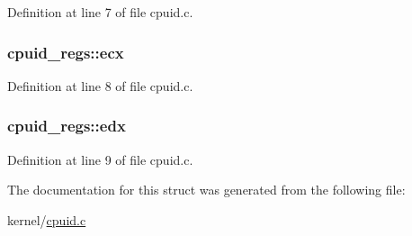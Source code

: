 \-Definition at line 7 of file cpuid.\-c.

\hypertarget{structcpuid__regs_a61c345a6aec2b65698243b63bb284ec3}{
\subsubsection[{ecx}]{ {\bf cpuid\-\_\-regs\-::ecx}}}\label{structcpuid__regs_a61c345a6aec2b65698243b63bb284ec3}


\-Definition at line 8 of file cpuid.\-c.

\hypertarget{structcpuid__regs_af071577d6f7f2ceb97e0f39d155cfaad}{
\subsubsection[{edx}]{ {\bf cpuid\-\_\-regs\-::edx}}}\label{structcpuid__regs_af071577d6f7f2ceb97e0f39d155cfaad}


\-Definition at line 9 of file cpuid.\-c.



\-The documentation for this struct was generated from the following file\-:\begin{DoxyCompactItemize}
\item 
kernel/\hyperlink{cpuid_8c}{cpuid.\-c}\end{DoxyCompactItemize}
